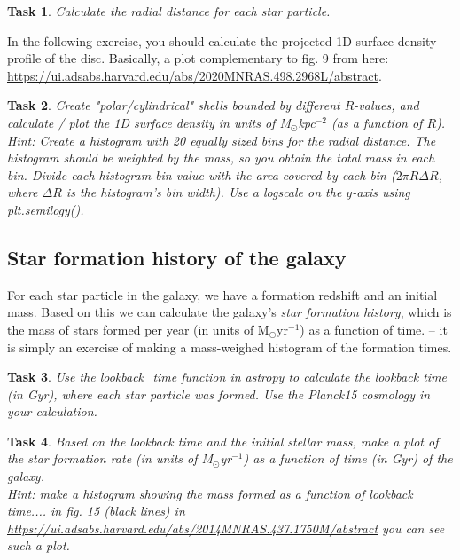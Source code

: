 \documentclass[11pt,a4paper]{article} %
\newtheorem{Exercise}{Task}
\begin{document}
{\color{ForestGreen}
\begin{Exercise}
Calculate the radial distance for each star particle.
\end{Exercise}}
In the following exercise, you should calculate the projected 1D surface density profile of the disc. Basically, a plot complementary to fig. 9 from here: \url{https://ui.adsabs.harvard.edu/abs/2020MNRAS.498.2968L/abstract}.
{\color{ForestGreen}
\begin{Exercise}
Create "polar/cylindrical" shells bounded by different $R$-values, and calculate / plot the 1D surface density in units of M$_\odot$kpc$^{-2}$ (as a function of $R$). \\Hint: Create a histogram with 20 equally sized bins for the radial distance. The histogram should be weighted by the mass, so you obtain the total mass in each bin. Divide each histogram bin value with the area covered by each bin ($2\pi R \Delta R$, where $\Delta R$ is the histogram's bin width). Use a logscale on the $y$-axis using {\ttm plt.semilogy()}. 
\end{Exercise}
}

\subsection*{Star formation history of the galaxy}

For each star particle in the galaxy, we have a formation redshift and an initial mass. Based on this we can calculate the galaxy's \emph{star formation history}, which is the mass of stars formed per year (in units of M$_\odot$yr$^{-1}$) as a function of time. -- it is simply an exercise of making a mass-weighed histogram of the formation times.

{\color{ForestGreen}
\begin{Exercise}
Use the {\ttm lookback\_time} function in {\ttm astropy} to calculate the lookback time (in Gyr), where each star particle was formed. Use the {\ttm Planck15} cosmology in your calculation.
\end{Exercise}
\begin{Exercise}
Based on the lookback time and the initial stellar mass, make a plot of the star formation rate (in units of M$_\odot$yr$^{-1}$) as a function of time (in Gyr) of the galaxy. \\\noindent{}Hint: make a histogram showing the mass formed as a function of lookback time.... in fig. 15 (black lines) in \url{https://ui.adsabs.harvard.edu/abs/2014MNRAS.437.1750M/abstract} you can see such a plot.
\end{Exercise}
}
\end{document}
